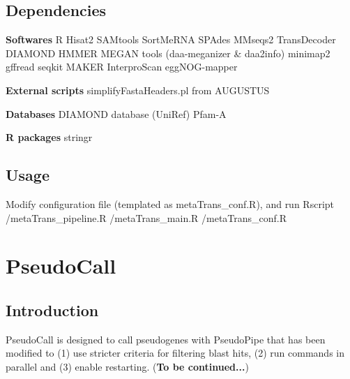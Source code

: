 \documentclass[11pt]{article}
\begin{document}
\begin{sloppypar}
\subsection{Dependencies}
\textbf{Softwares} \newline
R \newline
Hisat2 \newline
SAMtools \newline
SortMeRNA \newline
SPAdes \newline
MMseqs2 \newline
TransDecoder \newline
DIAMOND \newline
HMMER \newline
MEGAN tools (daa-meganizer & daa2info) \newline
minimap2 \newline
gffread \newline
seqkit \newline
MAKER \newline
InterproScan \newline
eggNOG-mapper \newline
\par
\textbf{External scripts}
simplifyFastaHeaders.pl from AUGUSTUS \newline
\par
\textbf{Databases} \newline
DIAMOND database (UniRef) \newline
Pfam-A \newline
\par
\textbf{R packages} \newline
stringr \newline
\subsection{Usage}
Modify configuration file (templated as metaTrans\_conf.R), and run \newline
Rscript /metaTrans\_pipeline.R /metaTrans\_main.R /metaTrans\_conf.R

\section{PseudoCall}
\subsection{Introduction}
PseudoCall is designed to call pseudogenes with PseudoPipe that has been modified to (1) use stricter criteria for filtering blast hits, (2) run commands in parallel and (3) enable restarting. (\textbf{To be continued...})

\end{sloppypar}
\end{document}
